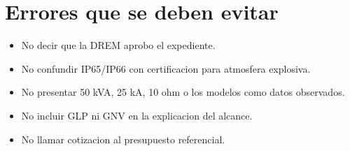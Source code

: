 \documentclass[12pt,letterpaper]{report}
\begin{document}
\chapter*{Errores que se deben evitar}
\thispagestyle{memoria}
\begin{itemize}
\item No decir que la DREM aprobo el expediente.
\item No confundir IP65/IP66 con certificacion para atmosfera explosiva.
\item No presentar 50 kVA, 25 kA, 10 ohm o los modelos como datos observados.
\item No incluir GLP ni GNV en la explicacion del alcance.
\item No llamar cotizacion al presupuesto referencial.
\end{itemize}
\end{document}
